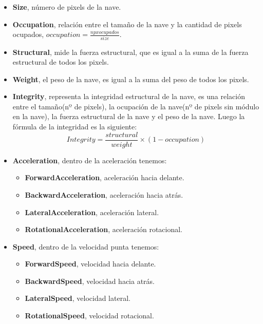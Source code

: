 \begin{itemize}
\item \textbf{Size}, número de pixels de la nave.
\item \textbf{Occupation}, relación entre el tamaño de la nave y la cantidad de pixels ocupados, $occupation = \frac{npxocupados}{size}$.
\item \textbf{Structural}, mide la fuerza estructural, que es igual a la suma de la fuerza estructural de todos los pixels.
\item \textbf{Weight}, el peso de la nave, es igual a la suma del peso de todos los pixels.
\item \textbf{Integrity}, representa la integridad estructural de la nave, es una relación entre el tamaño(nº de pixels), la ocupación de la nave(nº de pixels sin módulo en la nave), la fuerza estructural de la nave y el peso de la nave. Luego la fórmula de la integridad es la siguiente:
$$ Integrity = \frac{structural}{weight}\times(1-occupation) $$ 
\item \textbf{Acceleration}, dentro de la aceleración tenemos:
\begin{itemize}
\item \textbf{ForwardAcceleration}, aceleración hacia delante.
\item \textbf{BackwardAcceleration}, aceleración hacia atrás.
\item \textbf{LateralAcceleration}, aceleración lateral.
\item \textbf{RotationalAcceleration}, aceleración rotacional.
\end{itemize}
\item \textbf{Speed}, dentro de la velocidad punta tenemos:
\begin{itemize}
\item \textbf{ForwardSpeed}, velocidad hacia delante.
\item \textbf{BackwardSpeed}, velocidad hacia atrás.
\item \textbf{LateralSpeed}, velocidad lateral.
\item \textbf{RotationalSpeed}, velocidad rotacional.
\end{itemize}
\end{itemize}
\newpage

